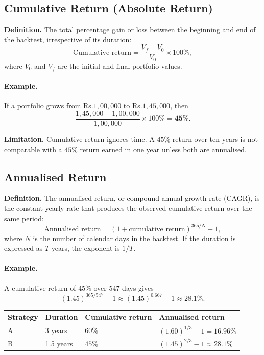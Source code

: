 \documentclass[12pt,openany]{book}
\theoremstyle{definition}
\theoremstyle{remark}
\begin{document}
\subsection{Cumulative Return (Absolute Return)}

\textbf{Definition.} The total percentage gain or loss between the beginning
and end of the backtest, irrespective of its duration:
\[
\text{Cumulative return}
    = \frac{V_f-V_0}{V_0}\times 100\%,
\]
where \(V_0\) and \(V_f\) are the initial and final portfolio values.

\paragraph{Example.}
If a portfolio grows from Rs.\(1{,}00{,}000\) to
Rs.\(1{,}45{,}000\), then
\[
\frac{1{,}45{,}000-1{,}00{,}000}{1{,}00{,}000}\times100\%
   = \mathbf{45\%}.
\]

\textbf{Limitation.} Cumulative return ignores time. A \(45\%\) return over
ten years is not comparable with a \(45\%\) return earned in one year unless
both are annualised.

\subsection{Annualised Return}

\textbf{Definition.} The annualised return, or compound annual growth rate
(CAGR), is the constant yearly rate that produces the observed cumulative
return over the same period:
\[
\text{Annualised return}
 = \left(1+\text{cumulative return}\right)^{365/N}-1,
\]
where \(N\) is the number of calendar days in the backtest. If the duration
is expressed as \(T\) years, the exponent is \(1/T\).

\paragraph{Example.}
A cumulative return of \(45\%\) over \(547\) days gives
\[
(1.45)^{365/547}-1
  \approx (1.45)^{0.667}-1
  \approx \mathbf{28.1\%}.
\]

\begin{center}
\small
\begin{tabular}{|L{0.18\textwidth}|L{0.16\textwidth}|L{0.22\textwidth}|L{0.28\textwidth}|}
\hline
\textbf{Strategy} & \textbf{Duration} & \textbf{Cumulative return} &
\textbf{Annualised return} \\ \hline
A & 3 years & \(60\%\) & \((1.60)^{1/3}-1=16.96\%\) \\ \hline
B & 1.5 years & \(45\%\) & \((1.45)^{2/3}-1\approx28.1\%\) \\ \hline
\end{tabular}
\end{center}
\end{document}
